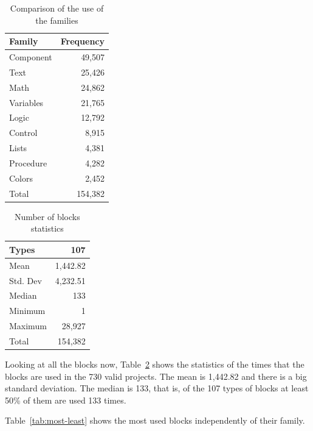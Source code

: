 \documentclass[a4paper]{article}
\begin{document}
\begin{table}
\begin{center}
\caption{Comparison of the use of the families}
\bigskip
\label{tab:block-fam-comp}
\begin{tabular}{|l|r|}
\hline
\textbf{Family} & \textbf{Frequency} \\ \hline
Component & 49,507 \\ \hline
Text	& 25,426\\ \hline
Math & 24,862\\ \hline
Variables & 21,765\\ \hline
Logic & 12,792\\ \hline
Control & 8,915\\ \hline
Lists & 4,381\\ \hline
Procedure & 4,282\\ \hline
Colors & 2,452\\ \hline
Total & 154,382\\ \hline
\end{tabular}
\end{center}
\end{table}

\begin{table}[ht]
\begin{center}
\caption{Number of blocks statistics}
\bigskip
\label{tab:number-blocks}
\begin{tabular}{|l|r|}
\hline
Types & 107\\ \hline
Mean & 1,442.82\\ \hline
Std. Dev & 4,232.51\\ \hline
Median & 133\\ \hline
Minimum & 1\\ \hline
Maximum & 28,927\\ \hline
Total & 154,382\\ \hline
\end{tabular}
\end{center}
\end{table}

Looking at all the blocks now, Table~\ref{tab:number-blocks} shows the statistics of the times that the blocks are used in the 730 valid projects. The mean is 1,442.82 and there is a big standard deviation. The median is 133, that is, of the 107 types of blocks at least 50\% of them are used 133 times.

Table~\ref{tab:most-least} shows the most used blocks independently of their family.
\end{document}
